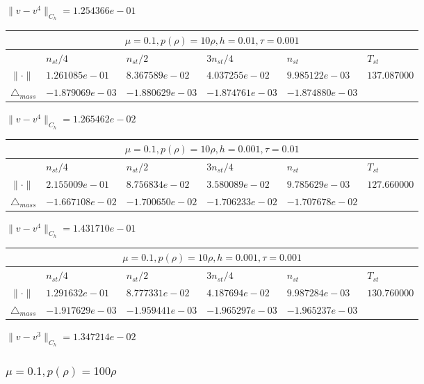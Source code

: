 \documentclass[12pt,a4paper]{article}
\begin{document}
$\|v-v^{4}\|_{C_h} = 1.254366e-01$

\begin{tabular}{*{6}{|l}|}
    \hline
     \\
    \hline
    &$n_{st}/4 $&$ n_{st}/2$&$3n_{st}/4$&$n_{st}$&$T_{st}$ \\
    \hline
$\|\cdot \|$& $1.261085e-01$ & $8.367589e-02$ & $4.037255e-02$ & $9.985122e-03$ &$137.087000$\\
\hline
$\triangle_{mass}$& $-1.879069e-03$ & $-1.880629e-03$ & $-1.874761e-03$ & $-1.874880e-03$ &\\
\hline
\end{tabular}

$\|v-v^{4}\|_{C_h} = 1.265462e-02$

\begin{tabular}{*{6}{|l}|}
    \hline
     \\
    \hline
    &$n_{st}/4 $&$ n_{st}/2$&$3n_{st}/4$&$n_{st}$&$T_{st}$ \\
    \hline
    $\|\cdot \|$& $2.155009e-01$ & $8.756834e-02$ & $3.580089e-02$ & $9.785629e-03$ &$127.660000$\\
\hline
$\triangle_{mass}$& $-1.667108e-02$ & $-1.700650e-02$ & $-1.706233e-02$ & $-1.707678e-02$ &\\
\hline
\end{tabular}

$\|v-v^{4}\|_{C_h} = 1.431710e-01$

\begin{tabular}{*{6}{|l}|}
    \hline
     \\
    \hline
    &$n_{st}/4 $&$ n_{st}/2$&$3n_{st}/4$&$n_{st}$&$T_{st}$ \\
    \hline
$\|\cdot \|$& $1.291632e-01$ & $8.777331e-02$ & $4.187694e-02$ & $9.987284e-03$ &$130.760000$\\
\hline
$\triangle_{mass}$& $-1.917629e-03$ & $-1.959441e-03$ & $-1.965297e-03$ & $-1.965237e-03$ &\\
\hline
\end{tabular}

$\|v-v^{3}\|_{C_h} = 1.347214e-02$

\subsubsection{$\mu = 0.1, p(\rho) = 100\rho $}
\end{document}
